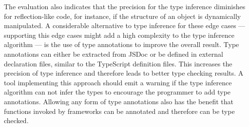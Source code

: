 The evaluation also indicates that the precision for the type inference diminishes for reflection-like code, for instance, if the structure of an object is dynamically manipulated. A considerable alternative to type inference for these edge cases --- supporting this edge cases might add a high complexity to the type inference algorithm --- is the use of type annotations to improve the overall result. Type annotations can either be extracted from JSDoc or be defined in external declaration files, similar to the TypeScript definition files. This increases the precision of type inference and therefore leads to better type checking results. A tool implementing this approach should emit a warning if the type inference algorithm can not infer the types to encourage the programmer to add type annotations. Allowing any form of type annotations also has the benefit that functions invoked by frameworks can be annotated and therefore can be type checked.
